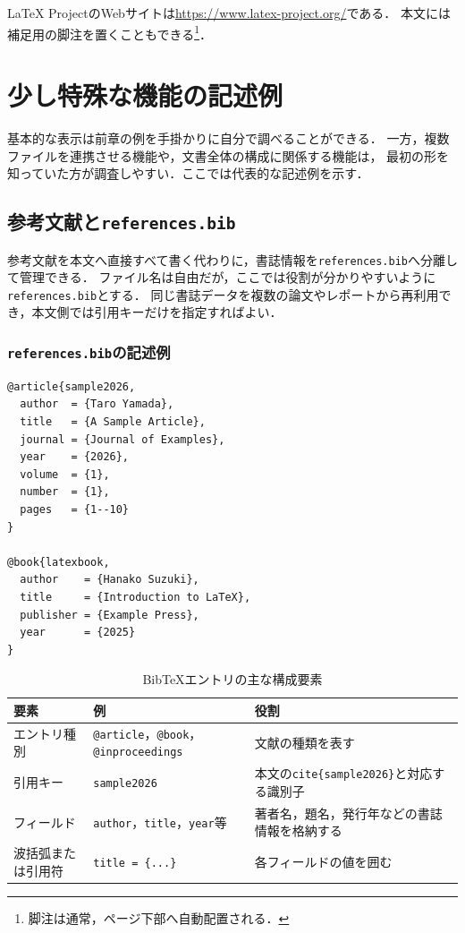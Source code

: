 \documentclass[a4paper,11pt]{jsarticle}
\newcommand{\code}[1]{\texttt{#1}}
\begin{document}
LaTeX ProjectのWebサイトは\url{https://www.latex-project.org/}である．
本文には補足用の脚注を置くこともできる\footnote{脚注は通常，ページ下部へ自動配置される．}．

\clearpage
\section{少し特殊な機能の記述例}

基本的な表示は前章の例を手掛かりに自分で調べることができる．
一方，複数ファイルを連携させる機能や，文書全体の構成に関係する機能は，
最初の形を知っていた方が調査しやすい．ここでは代表的な記述例を示す．

\subsection{参考文献と\code{references.bib}}

参考文献を本文へ直接すべて書く代わりに，書誌情報を\code{references.bib}へ分離して管理できる．
ファイル名は自由だが，ここでは役割が分かりやすいように\code{references.bib}とする．
同じ書誌データを複数の論文やレポートから再利用でき，本文側では引用キーだけを指定すればよい．

\subsubsection{\code{references.bib}の記述例}

\begin{lstlisting}
@article{sample2026,
  author  = {Taro Yamada},
  title   = {A Sample Article},
  journal = {Journal of Examples},
  year    = {2026},
  volume  = {1},
  number  = {1},
  pages   = {1--10}
}

@book{latexbook,
  author    = {Hanako Suzuki},
  title     = {Introduction to LaTeX},
  publisher = {Example Press},
  year      = {2025}
}
\end{lstlisting}

\begin{table}[H]
  \centering
  \small
  \caption{BibTeXエントリの主な構成要素}
  \begin{tabular}{|>{\raggedright\arraybackslash}p{31mm}
                  |>{\raggedright\arraybackslash}p{48mm}
                  |>{\raggedright\arraybackslash}p{61mm}|}
    \hline
    要素 & 例 & 役割 \\
    \hline
    エントリ種別 & \code{@article}，\code{@book}，\code{@inproceedings} & 文献の種類を表す \\
    \hline
    引用キー & \code{sample2026} & 本文の\code{cite\{sample2026\}}と対応する識別子 \\
    \hline
    フィールド & \code{author}，\code{title}，\code{year}等 & 著者名，題名，発行年などの書誌情報を格納する \\
    \hline
    波括弧または引用符 & \code{title = \{...\}} & 各フィールドの値を囲む \\
    \hline
  \end{tabular}
\end{table}
\end{document}
